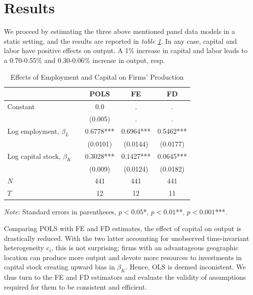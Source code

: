 \documentclass[11pt]{article}
\begin{document}
\section{Results}
We proceed by estimating the three above mentioned panel data models in a static setting, and the results are reported in \textit{table \ref{tab:est_results}}. In any case, capital and labor have positive effects on output. A 1\% increase in capital and labor leads to a 0.70-0.55\% and 0.30-0.06\% increase in output, resp. 
\begin{table}[H]    
        \caption{Effects of Employment and Capital on Firms' Production}
        \centering
        \label{tab:est_results}
        \begin{threeparttable}     
            \begin{tabular}{lcccc}
            \toprule
                                & {} &       POLS &         FE &         FD \\
            \midrule
            Constant            & {} &        0.0 &          . &          . \\
                                & {} &    (0.005) &          . &          . \\
            Log employment, $\beta_L$      & {} &  0.6778*** &  0.6964*** &  0.5462*** \\
                                & {} &   (0.0101) &   (0.0144) &   (0.0177) \\
            Log capital stock, $\beta_K$   & {} &  0.3028*** &  0.1427*** &  0.0645*** \\
                                & {} &    (0.009) &   (0.0124) &   (0.0182) \\
            \midrule
            $N$                 & {} &        441 &        441 &        441 \\
            $T$                 & {} &        12  &        12  &        11  \\
            \bottomrule
            \end{tabular}
                \begin{tablenotes}
                \footnotesize \textit{Note:} Standard errors in parentheses, $p<0.05$*, $p<0.01$**, $p<0.001$***.
                \end{tablenotes}
        \end{threeparttable}
\end{table}

Comparing POLS with FE and FD estimates, the effect of capital on output is drastically reduced. With the two latter accounting for unobserved time-invariant heterogeneity $c_i$, this is not surprising; firms with an advantageous geographic location can produce more output and devote more resources to investments in capital stock creating upward bias in $\beta_K$. Hence, OLS is deemed inconistent. We thus turn to the FE and FD estimators and evaluate the validity of assumptions required for them to be consistent and efficient. 
\end{document}
